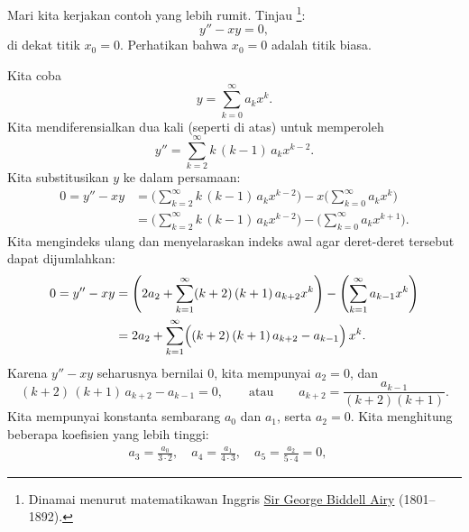 \begin{example}
Mari kita kerjakan contoh yang lebih rumit. Tinjau
\emph{}%
\footnote{Dinamai menurut matematikawan Inggris
\href{http://en.wikipedia.org/wiki/George_Biddell_Airy}{Sir George Biddell Airy}
(1801--1892).}:
\begin{equation*}
y'' - xy = 0 ,
\end{equation*}
di dekat titik $x_0 = 0$. Perhatikan bahwa $x_0 = 0$ adalah titik biasa.

\pagebreak[2]
Kita coba
\begin{equation*}
y = \sum_{k=0}^\infty a_k x^k .
\end{equation*}
Kita mendiferensialkan dua kali (seperti di atas) untuk memperoleh
\begin{equation*}
y'' = \sum_{k=2}^\infty k\,(k-1) \, a_k x^{k-2} .
\end{equation*}
Kita substitusikan $y$ ke dalam persamaan:
\begin{equation*}
\begin{split}
0 = y''-xy &= 
\Biggl( \sum_{k=2}^\infty k\,(k-1) \, a_k x^{k-2}  \Biggr)
-
x
\Biggl( \sum_{k=0}^\infty a_k x^k \Biggr)
\\
&=
\Biggl( \sum_{k=2}^\infty k\,(k-1) \, a_k x^{k-2}  \Biggr)
-
\Biggl( \sum_{k=0}^\infty a_k x^{k+1} \Biggr) .
\end{split}
\end{equation*}
Kita mengindeks ulang dan menyelaraskan indeks awal agar deret-deret tersebut
dapat dijumlahkan:
\begin{equation*}
\begin{split}
0 = y''-xy
&= 
\Biggl( 2 a_2 + \sum_{k=1}^\infty (k+2)\,(k+1) \, a_{k+2} x^k  \Biggr)
-
\Biggl( \sum_{k=1}^\infty a_{k-1} x^k \Biggr)
\\
&= 
2 a_2 + 
\sum_{k=1}^\infty \Bigl( (k+2)\,(k+1) \, a_{k+2} - a_{k-1} \Bigr) \, x^k .
\end{split}
\end{equation*}
Karena $y''-xy$ seharusnya bernilai $0$, kita mempunyai $a_2 = 0$, dan
\begin{equation*}
(k+2)\,(k+1) \,a_{k+2} - a_{k-1} = 0 ,
\qquad
\text{atau}
\qquad
a_{k+2} = \frac{a_{k-1}}{(k+2)(k+1)} .
\end{equation*}
Kita mempunyai konstanta sembarang $a_0$ dan $a_1$, serta $a_2 = 0$.
Kita menghitung beberapa koefisien yang lebih tinggi:
\begin{multline*}
a_3 = \frac{a_0}{3 \cdot 2}, \quad
a_4 = \frac{a_1}{4 \cdot 3}, \quad
a_5 = \frac{a_2}{5 \cdot 4} = 0, \quad

\end{multline*}
\end{example}
